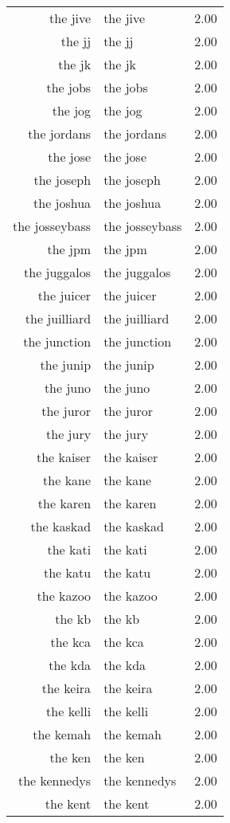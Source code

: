 \begin{table}[ht]
\begin{tabular}{rlr}
  the jive & the jive & 2.00 \\ 
  the jj & the jj & 2.00 \\ 
  the jk & the jk & 2.00 \\ 
  the jobs & the jobs & 2.00 \\ 
  the jog & the jog & 2.00 \\ 
  the jordans & the jordans & 2.00 \\ 
  the jose & the jose & 2.00 \\ 
  the joseph & the joseph & 2.00 \\ 
  the joshua & the joshua & 2.00 \\ 
  the josseybass & the josseybass & 2.00 \\ 
  the jpm & the jpm & 2.00 \\ 
  the juggalos & the juggalos & 2.00 \\ 
  the juicer & the juicer & 2.00 \\ 
  the juilliard & the juilliard & 2.00 \\ 
  the junction & the junction & 2.00 \\ 
  the junip & the junip & 2.00 \\ 
  the juno & the juno & 2.00 \\ 
  the juror & the juror & 2.00 \\ 
  the jury & the jury & 2.00 \\ 
  the kaiser & the kaiser & 2.00 \\ 
  the kane & the kane & 2.00 \\ 
  the karen & the karen & 2.00 \\ 
  the kaskad & the kaskad & 2.00 \\ 
  the kati & the kati & 2.00 \\ 
  the katu & the katu & 2.00 \\ 
  the kazoo & the kazoo & 2.00 \\ 
  the kb & the kb & 2.00 \\ 
  the kca & the kca & 2.00 \\ 
  the kda & the kda & 2.00 \\ 
  the keira & the keira & 2.00 \\ 
  the kelli & the kelli & 2.00 \\ 
  the kemah & the kemah & 2.00 \\ 
  the ken & the ken & 2.00 \\ 
  the kennedys & the kennedys & 2.00 \\ 
  the kent & the kent & 2.00 \\ 

\end{tabular}
\end{table}
